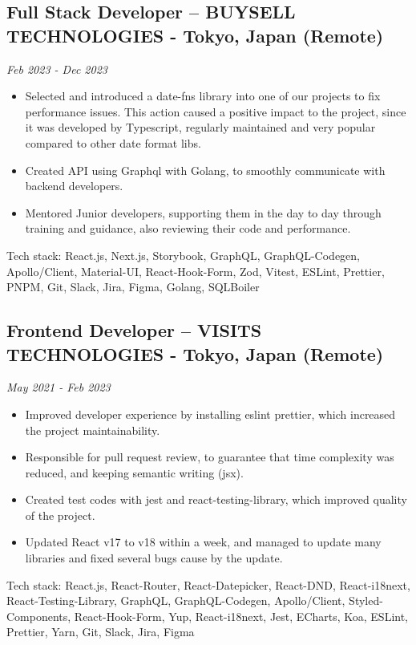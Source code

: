 \documentclass{article}
\begin{document}
\subsection*{Full Stack Developer – BUYSELL TECHNOLOGIES - Tokyo, Japan (Remote)}
\textit{Feb 2023 - Dec 2023}
\begin{itemize}[leftmargin=*, itemsep=0pt]
    \item Selected and introduced a date-fns library into one of our projects to fix performance issues. This action caused a positive impact to the project, since it was developed by Typescript, regularly maintained and very popular compared to other date format libs.
    \item Created API using Graphql with Golang, to smoothly communicate with backend developers.
    \item Mentored Junior developers, supporting them in the day to day through training and guidance, also reviewing their code and performance.
\end{itemize}
Tech stack: React.js, Next.js, Storybook, GraphQL, GraphQL-Codegen, Apollo/Client, Material-UI, React-Hook-Form, Zod, Vitest, ESLint, Prettier, PNPM, Git, Slack, Jira, Figma, Golang, SQLBoiler

\subsection*{Frontend Developer – VISITS TECHNOLOGIES - Tokyo, Japan (Remote)}
\textit{May 2021 - Feb 2023}
\begin{itemize}[leftmargin=*, itemsep=0pt]
    \item Improved developer experience by installing eslint prettier, which increased the project maintainability.
    \item Responsible for pull request review, to guarantee that time complexity was reduced, and keeping semantic writing (jsx).
    \item Created test codes with jest and react-testing-library, which improved quality of the project.
    \item Updated React v17 to v18 within a week, and managed to update many libraries and fixed several bugs cause by the update.
\end{itemize}
Tech stack: React.js, React-Router, React-Datepicker, React-DND, React-i18next, React-Testing-Library, GraphQL, GraphQL-Codegen, Apollo/Client, Styled-Components, React-Hook-Form, Yup, React-i18next, Jest, ECharts, Koa, ESLint, Prettier, Yarn, Git, Slack, Jira, Figma
\end{document}
